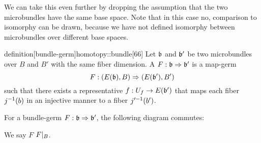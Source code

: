 \begin{myparagraph} We can take this even further by dropping the assumption that the two microbundles have the same base space. Note that in this case no, comparison to isomorphy can be drawn, because we have not defined isomorphy between microbundles over different base spaces. \end{myparagraph}

\begin{mystatement}{definition}[bundle-germ]{homotopy::bundle}[66] Let $\bb$ and $\bb'$ be two microbundles over $B$ and $B'$ with the same fiber dimension. A  $\germdef{F}{\bb}{\bb'}$ is a map-germ \[ \germdef{F}{(E(\bb), B)}{(E(\bb'), B')} \] such that there exists a representative $f: U_f \to E(\bb')$ that maps each fiber $j^{-1}(b)$ in an injective manner to a fiber $j'^{-1}(b')$. \end{mystatement}

\begin{myparagraph} For a bundle-germ $\germdef{F}{\bb}{\bb'}$, the following diagram commutes: \begin{center}  \end{center} We say $F$  $F\vert_{B}$. \end{myparagraph}